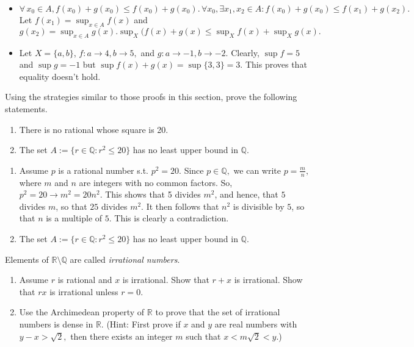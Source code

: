 \documentclass[12pt,letterpaper,boxed]{hmcpset}
\begin{document}
\begin{solution}
\begin{itemize}
	\itemsep0em
	\item $\forall \, x_0 \in A, f(x_0) + g(x_0) \leq f(x_0) + g(x_0). \,\forall x_0, \exists x_1, x_2 \in A : f(x_0) + g(x_0) \leq f(x_1) + g(x_2).$ Let $f(x_1) = \sup_{x \in A} f(x)$ and $g(x_2) = \sup_{x \in A} g(x). \sup_{X} (f(x) + g(x) \leq \sup_{X} f(x) + \sup_{X} g(x).$ 
	\item Let $X=\{a,b\}$, $f : a \rightarrow 4, b \rightarrow 5,$ and $g : a \rightarrow -1, b \rightarrow -2.$ Clearly, $\sup f=5$ and $\sup g = -1$ but $\sup f(x) + g(x) = \sup \{3,3\}=3.$ This proves that equality doesn't hold.
\end{itemize}

\end{solution}

\begin{problem}[Exercise 3.3.]
Using the strategies similar to those proofs in this section, prove the following statements.
\vspace{-2mm}
\begin{enumerate}
	\itemsep0em
	\item There is no rational whose square is 20.
	\item The set $A := \{r \in \mathbb{Q} : r^2 \le 20\}$ has no least upper bound in $\mathbb{Q}$. 
\end{enumerate}
\end{problem}

\begin{solution}
\vspace{-2mm}
\begin{enumerate}
	\itemsep0em
	\item Assume $p$ is a rational number s.t. $p^{2}=20.$ Since $p\in\mathbb{Q},$ we can write $p = \frac{m}{n},$ where $m$ and $n$ are integers with no common factors. So, $p^{2}=20 \rightarrow m^{2}=20n^{2}.$ This shows that 5 divides $m^2$, and hence, that $5$ divides $m$, so that $25$ divides $m^2.$ It then follows that $n^2$ is divisible by $5$, so that $n$ is a multiple of $5$. This is clearly a contradiction.
	\item The set $A := \{r \in \mathbb{Q} : r^2 \le 20\}$ has no least upper bound in $\mathbb{Q}$. 
\end{enumerate}
\end{solution}

\begin{problem}[Exercise 4.6.]
Elements of $\mathbb{R}\setminus\mathbb{Q}$ are called \textit{irrational numbers}.
\begin{enumerate}
	\itemsep0em
	\item Assume $r$ is rational and $x$ is irrational. Show that $r + x$ is irrational. Show that $rx$ is irrational unless $r=0$.
	\item Use the Archimedean property of $\mathbb{R}$ to prove that the set of irrational numbers is dense in $\mathbb{R}.$ (Hint: First prove if $x$ and $y$ are real numbers with $y - x > \sqrt{2},$ then there exists an integer $m$ such that $x < m\sqrt{2} < y$.)
\end{enumerate}
\end{problem}
\end{document}
